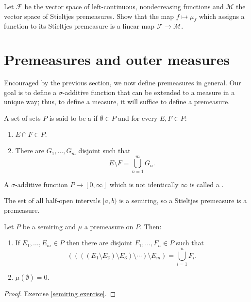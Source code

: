 \begin{exercise}
Let $\mathcal F$ be the vector space of left-continuous, nondecreasing functions and $\mathcal M$ the vector space of Stieltjes premeasures.
Show that the map $f \mapsto \mu_f$ which assigns a function to its Stieltjes premeasure is a linear map $\mathcal F \to \mathcal M$.
\end{exercise}

\section{Premeasures and outer measures}
Encouraged by the previous section, we now define premeasures in general.
Our goal is to define a $\sigma$-additive function that can be extended to a measure in a unique way; thus, to define a measure, it will suffice to define a premeasure.

\begin{definition}
A set of sets $P$ is said to be a  if $\emptyset \in P$ and for every $E, F \in P$:
\begin{enumerate}
\item $E \cap F \in P$.
\item There are $G_1, \dots, G_{m}$ disjoint such that
\[E \setminus F = \bigcup_{n=1}^{m} G_{n}.\]
\end{enumerate}
A $\sigma$-additive function $P \to [0, \infty]$ which is not identically $\infty$ is called a .
\end{definition}

\begin{example}
The set of all half-open intervals $[a, b)$ is a semiring, so a Stieltjes premeasure is a premeasure.
\end{example}

\begin{lemma}
\label{semiring prop 1}
Let $P$ be a semiring and $\mu$ a premeasure on $P$. Then:
\begin{enumerate}
\item If $E_1, \dots, E_{m} \in P$ then there are disjoint $F_1, \dots, F_{n} \in P$ such that
\[((((E_1 \setminus E_2) \setminus E_3) \setminus \cdots) \setminus E_{m}) = \bigcup_{i=1}^{n} F_i.\]
\item $\mu(\emptyset) = 0$.
\end{enumerate}
\end{lemma}
\begin{proof}
Exercise \ref{semiring exercise}.
\end{proof}

